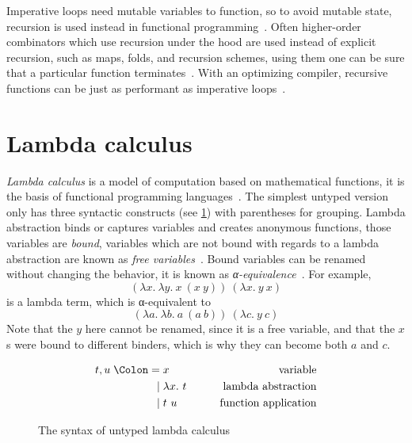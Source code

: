 Imperative loops need mutable variables to function, so to avoid mutable state,
recursion is used instead in functional programming~\cite{functional-Hudak}.
Often higher-order combinators which use recursion under the hood are used
instead of explicit recursion, such as maps, folds, and recursion schemes, using
them one can be sure that a particular function terminates~\cite{fold-Hutton,
  bananas-Meijer}. With an optimizing compiler, recursive functions can be just as
performant as imperative loops~\cite{sicp}.

\section{Lambda calculus}\label{sec:lambda}

\emph{Lambda calculus} is a model of computation based on mathematical
functions, it is the basis of functional programming
languages~\cite{functional-Hudak}. The simplest untyped version only has three
syntactic constructs (see \cref{fig:lambda-syntax}) with parentheses for
grouping. Lambda abstraction binds or captures variables and creates anonymous
functions, those variables are \emph{bound}, variables which are not bound with
regards to a lambda abstraction are known as \emph{free
  variables}~\cite{functional-Barendregt, lambda-Hindley, lambda-Church}. Bound
variables can be renamed without changing the behavior, it is known as
\emph{α-equivalence}~\cite{lambda-Revesz, type-Pierce, tt-Nederpelt}. For
example,
\begin{equation}
  (\lambda x.\ \lambda y.\ x\ (x\ y))\ (\lambda x.\ y\ x)
  \label{eq:lambda-ex}
\end{equation} is a
lambda term, which is α-equivalent to
\begin{equation}
  (\lambda a.\ \lambda b.\ a\ (a\ b))\ (\lambda c.\ y\ c)
  \label{eq:lambda-ex-rename}
\end{equation}
Note that the \(y\) here cannot be renamed, since it is a free variable, and
that the \(x\)s were bound to different binders, which is why they can become
both \(a\) and \(c\).

\begin{figure}
  \begin{alignat*}{2}
    t, u \Coleqq{} & x             & \qquad\text{variable}             \\
    \mid{}         & \lambda x.\ t & \qquad\text{lambda abstraction}   \\
    \mid{}         & t\ u          & \qquad\text{function application}
  \end{alignat*}
  \caption{The syntax of untyped lambda calculus}\label{fig:lambda-syntax}
\end{figure}

